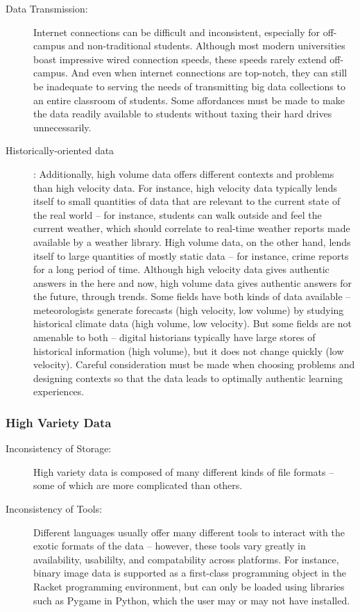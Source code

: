 \begin{description}
	\item[Data Transmission:] Internet connections can be difficult and inconsistent, especially for off-campus
and non-traditional students. Although most modern universities boast impressive wired connection
speeds, these speeds rarely extend off-campus. And even when internet connections are top-notch,
they can still be inadequate to serving the needs of transmitting big data collections to an entire
classroom of students. Some affordances must be made to make the data readily available to students without taxing their hard drives unnecessarily.
	\item[Historically-oriented data]: Additionally, high volume data offers different contexts and problems than high velocity data.
For instance, high velocity data typically lends itself to small quantities of data that are relevant to the current state of the real world -- for instance, students can walk outside and feel the current weather, which should correlate to real-time weather reports made available by a weather library.
High volume data, on the other hand, lends itself to large quantities of mostly static data -- for instance, crime reports for a long period of time.
Although high velocity data gives authentic answers in the here and now, high volume data gives authentic answers for the future, through trends.
Some fields have both kinds of data available -- meteorologists generate forecasts (high velocity, low volume) by studying historical climate data (high volume, low velocity).
But some fields are not amenable to both -- digital historians typically have large stores of historical information (high volume), but it does not change quickly (low velocity).
Careful consideration must be made when choosing problems and designing contexts so that the data leads to optimally authentic learning experiences.
\end{description}


\subsubsection{High Variety Data}

\begin{description}
\item[Inconsistency of Storage:] High variety data is composed of many different kinds of file formats -- some of which are more complicated than others.
\item[Inconsistency of Tools:] Different languages usually offer many different tools to interact with the exotic formats of the data -- however, these tools vary greatly in availability, usabililty, and compatability across platforms. For instance, binary image data is supported as a first-class programming object in the Racket programming environment, but can only be loaded using libraries such as Pygame in Python, which the user may or may not have installed.
\end{description}
